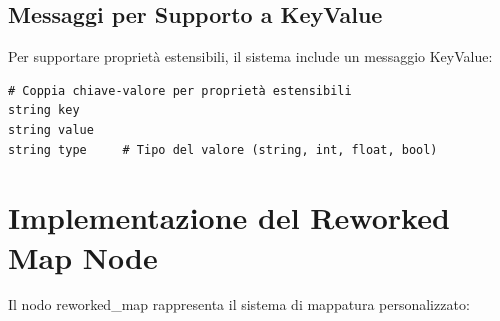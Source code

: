 \documentclass[12pt,a4paper,twoside,openright]{book}
\begin{document}
\subsection{Messaggi per Supporto a KeyValue}

Per supportare proprietà estensibili, il sistema include un messaggio KeyValue:

\begin{lstlisting}[caption={KeyValue.msg - Supporto proprietà estensibili}]
# Coppia chiave-valore per proprietà estensibili
string key
string value
string type     # Tipo del valore (string, int, float, bool)
\end{lstlisting}

\section{Implementazione del Reworked Map Node}

Il nodo reworked\_map rappresenta il sistema di mappatura personalizzato:
\end{document}
